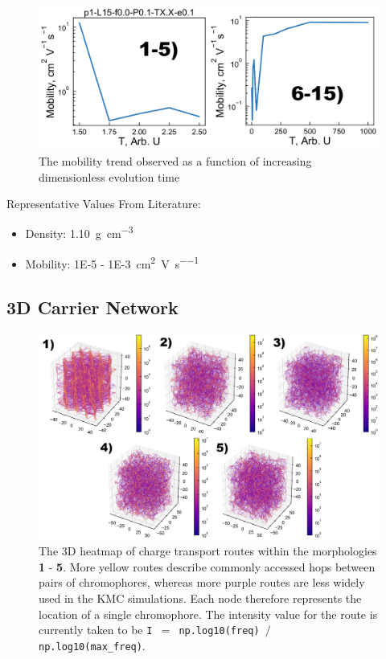 \documentclass[12pt]{article}
\def\mobunits{\square\centi\meter\per\volt\per\second}
\def\gcm{\gram\per\cubic\centi\meter}
\begin{document}
\begin{figure}[h!]\centering
	\includegraphics[width=\textwidth]{Figures/mobilityHole.pdf}
    \caption{The mobility trend observed as a function of increasing dimensionless evolution time}
	\label{fig:MSD}
\end{figure}

Representative Values From Literature:
\begin{itemize}
    \item{Density: \SI{1.10}{\gcm}\cite{Newbloom2012a}}
\item{Mobility: \SI{1E-5}{} - \SI{1E-3}{\mobunits}\cite{Ballantyne2008b,Mauer2010,Pandey2000,Kim2006}}
\end{itemize}

\clearpage

\subsection{3D Carrier Network}

\begin{figure}[h!]\centering
	\includegraphics[width=\textwidth]{Figures/3dHole.png}
    \caption{The 3D heatmap of charge transport routes within the morphologies \textbf{1} - \textbf{5}.
    More yellow routes describe commonly accessed hops between pairs of chromophores, whereas more purple routes are less widely used in the KMC simulations.
    Each node therefore represents the location of a single chromophore.
The intensity value for the route is currently taken to be \texttt{I $=$ np.log10(freq) $/$ np.log10(max\_freq)}.}
	\label{fig:3dNetwork}
\end{figure}
\end{document}

